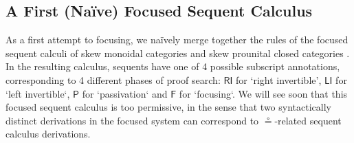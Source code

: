 \documentclass[submission,copyright,creativecommons]{eptcs}
\theoremstyle{definition}
\newcommand{\RI}{\mathsf{RI}}
\newcommand{\LI}{\mathsf{LI}}
\newcommand{\Pass}{\mathsf{P}}
\newcommand{\F}{\mathsf{F}}
\begin{document}
\subsection{A First (Na{\"i}ve) Focused Sequent Calculus}
As a first attempt to focusing, we na{\"i}vely merge together the rules of the focused sequent calculi of skew monoidal categories \cite{uustalu:sequent:2021} and skew prounital closed categories \cite{uustalu:deductive:nodate}. In the resulting calculus, sequents have one of 4 possible subscript annotations, corresponding to 4 different phases of proof search: $\RI$ for `right invertible', $\LI$ for `left invertible`, $\Pass$ for `passivation` and $\F$ for `focusing`. We will see soon that this focused sequent calculus is too permissive, in the sense that two syntactically distinct derivations in the focused system can correspond to $\circeq$-related sequent calculus derivations.
\end{document}
